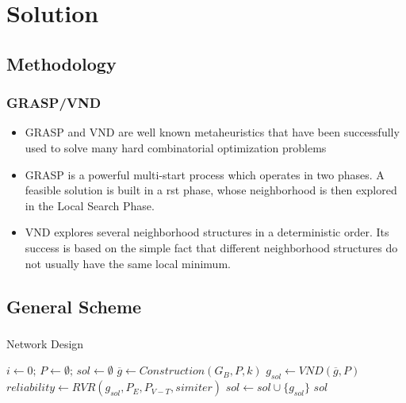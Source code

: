 \section{Solution}
\subsection{Methodology}
\begin{frame}\frametitle{GRASP/VND}
\begin{block}{}
\begin{small}
\begin{itemize}
 \item GRASP and VND are well known metaheuristics that have been successfully used to solve many hard combinatorial optimization problems
 \item GRASP is a powerful multi-start process which operates in two phases. A feasible solution is built in a rst phase, whose neighborhood is then explored in the Local Search Phase. 
 \item VND explores several neighborhood structures in a deterministic order. Its success is based on the simple fact that different neighborhood structures do not usually have the same local minimum.
\end{itemize} 
\end{small}
\end{block}
\end{frame}

\subsection{General Scheme}
\begin{frame}\frametitle{}
    \begin{block}{Network Design}
\begin{algorithm}[H]
\caption{$sol = NetworkDesign(G_B,iter,k,p_{min},P_E,P_{V-T},simiter)$}
\begin{algorithmic}[1]
\begin{small}    
\STATE $i \leftarrow 0; \, P \leftarrow \emptyset; \, sol \leftarrow \emptyset$
\STATE $\overline{g} \leftarrow Construction(G_B,P,k)$
\STATE $g_{sol} \leftarrow VND(\overline{g},P)$
\STATE $reliability \leftarrow RVR(g_{sol},P_E,P_{V-T},simiter)$
\STATE $sol \leftarrow sol \cup \{g_{sol}\}$
\ENDIF
\ENDWHILE
\RETURN $sol$
\end{small}
\end{algorithmic}
\end{algorithm}
    \end{block}
\end{frame}

